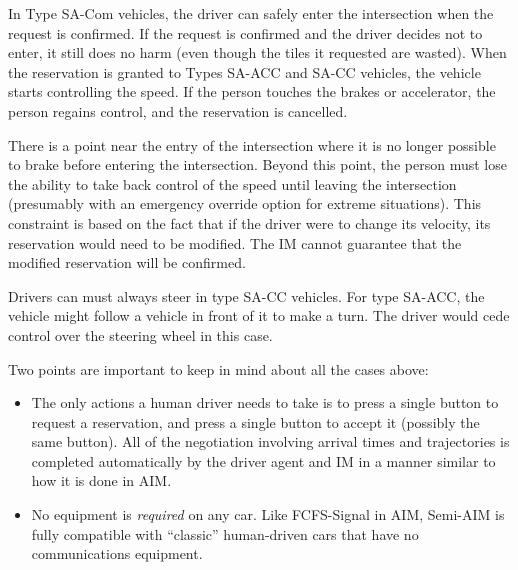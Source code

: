In Type SA-Com vehicles, the driver can safely enter the intersection
when the request is confirmed. If the request is confirmed and the
driver decides not to enter, it still does no harm (even though the
tiles it requested are wasted).  When the reservation is granted to
Types SA-ACC and SA-CC vehicles, the vehicle starts controlling the
speed.  If the person touches the brakes or accelerator, the person
regains control, and the reservation is cancelled.

There is a point near the entry of the intersection where it is no
longer possible to brake before entering the intersection. Beyond this
point, the person must lose the ability to take back control of the
speed until leaving the intersection (presumably with an emergency
override option for extreme situations).  This constraint is based on
the fact that if the driver were to change its velocity, its
reservation would need to be modified.  The IM cannot guarantee that
the modified reservation will be confirmed.

Drivers can must always steer in type SA-CC vehicles. For type SA-ACC,
the vehicle might follow a vehicle in front of it to make a turn. The
driver would cede control over the steering wheel in this case.

Two points are important to keep in mind about all the cases above:
\begin{itemize}

\item The only actions a human driver needs to take is to press a
single button to request a reservation, and press a single button to
accept it (possibly the same button).  All of the negotiation
involving arrival times and trajectories is completed automatically by
the driver agent and IM in a manner similar to how it is done in AIM.

\item No equipment is \emph{required} on any car.  Like FCFS-Signal in
AIM, Semi-AIM is fully compatible with ``classic'' human-driven cars
that have no communications equipment.

\end{itemize}



